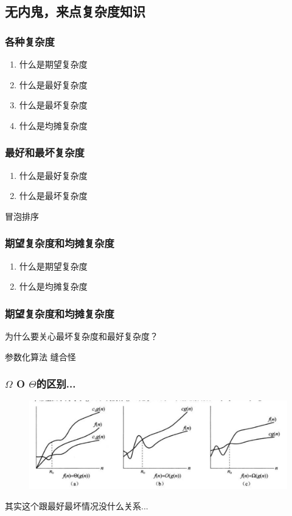 \documentclass{beamer}
\begin{document}
	\subsection{无内鬼，来点复杂度知识}
	\begin{frame}
		\frametitle{各种复杂度}
		\begin{enumerate}
			\item 什么是期望复杂度
			\item 什么是最好复杂度
			\item 什么是最坏复杂度
			\item 什么是均摊复杂度
		\end{enumerate}
	\end{frame}

	\begin{frame}
		\frametitle{最好和最坏复杂度}
		\begin{enumerate}
			\item 什么是最好复杂度
			\item 什么是最坏复杂度
		\end{enumerate}
		冒泡排序
	\end{frame}

	\begin{frame}
		\frametitle{期望复杂度和均摊复杂度}
		\begin{enumerate}
			\item 什么是期望复杂度
			\item 什么是均摊复杂度
		\end{enumerate}
	\end{frame}

	\begin{frame}
		\frametitle{期望复杂度和均摊复杂度}
		为什么要关心最坏复杂度和最好复杂度？

		参数化算法 \quad 缝合怪
	\end{frame}

	\begin{frame}
		\frametitle{$\Omega$ O $\Theta$的区别...}
		\begin{figure}[H]
			\centering
			\includegraphics[scale=0.27]{./img/Ocomplexity.jpg}
		\end{figure}
		\pause
		其实这个跟最好最坏情况没什么关系...
	\end{frame}
\end{document}
